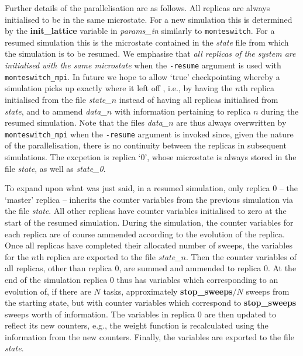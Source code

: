 \documentclass{report}
\begin{document}
Further details of the parallelisation are as follows. All replicas are always initialised to be in the same microstate. For a new simulation this is 
determined by the \textbf{init\_lattice} variable in \emph{params\_in} similarly to \texttt{monteswitch}. For a resumed simulation this is the microstate 
contained in the \emph{state} file from which the simulation is to be resumed. We emphasise that \emph{all replicas of the system are initialised with 
the same microstate} when the \texttt{-resume} argument is used with \texttt{monteswitch\_mpi}. In future we hope to allow `true' checkpointing 
whereby a simulation picks up exactly where it left off , i.e., by having the $n$th replica initialised from the file \emph{state\_}$n$ instead of having
all replicas initialised from \emph{state}, and to ammend \emph{data\_}$n$ with information pertaining to replica $n$ during the resumed
simulation. Note that the files \emph{data\_}$n$ are thus always overwritten by \texttt{monteswitch\_mpi} when the \texttt{-resume} argument is
invoked since, given the nature of the parallelisation, there is no continuity between the replicas in subsequent simulations. The excpetion is replica `0',
whose microstate is always stored in the file \emph{state}, as well as \emph{state\_0}.

To expand upon what was just said, in a resumed simulation, only replica 0 -- the `master' replica -- inherits the counter variables from the previous 
simulation via the file \emph{state}. All other replicas have counter variables initialised to zero at the start of the resumed simulation.
During the simulation, the counter variables for each replica are of course ammended according to the evolution of the replica. Once all replicas have
completed their allocated number of sweeps, the variables for the $n$th replica are exported to the file \emph{state\_}$n$. Then 
the counter variables of all replicas, other than replica 0, are summed and ammended to replica 0. At the end of the simulation replica 0 thus has
variables which corresponding to an evolution of, if there are $N$ tasks, approximately \textbf{stop\_sweeps}$/N$ sweeps from the starting state, 
but with counter variables which correspond to \textbf{stop\_sweeps} sweeps worth of information. The variables in replica 0 are then updated to reflect 
its new counters, e.g., the weight function is recalculated using the information from the new counters. Finally, the variables are
exported to the file \emph{state}. 



\end{document}
